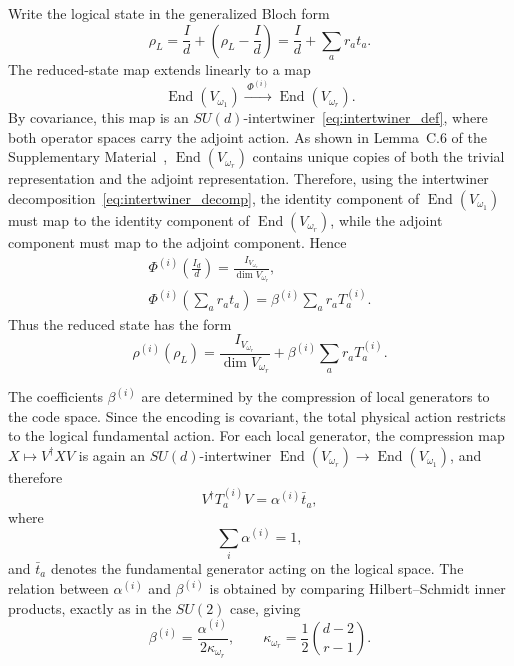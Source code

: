 \documentclass[10pt,twocolumn,superscriptaddress,aps,amsmath,amssymb,citeautoscript,floatfix,prx]{revtex4-2}
\theoremstyle{plain}
\theoremstyle{plain}
\theoremstyle{plain}
\theoremstyle{plain}
\theoremstyle{plain}
\theoremstyle{plain}
\begin{document}
Write the logical state in the generalized Bloch form
\begin{equation}\label{eq:general_bloch}
\rho_L
=
\frac{I}{d}
+
\left(\rho_L-\frac{I}{d}\right)
=
\frac{I}{d}
+
\sum_a r_a t_a .
\end{equation}
The reduced-state map extends linearly to a map
$$
    \operatorname{End}(V_{\omega_1})
    \xrightarrow{\;\Phi^{(i)}\;}
    \operatorname{End}(V_{\omega_r}) .
$$
By covariance, this map is an $SU(d)$-intertwiner~\eqref{eq:intertwiner_def}, where both operator spaces carry the adjoint action. As shown in Lemma~C.6 of the Supplementary Material~\cite{SuppMat}, $\operatorname{End}(V_{\omega_r})$ contains unique copies of both the trivial representation and the adjoint representation. Therefore, using the intertwiner decomposition~\eqref{eq:intertwiner_decomp}, the identity component of $\operatorname{End}(V_{\omega_1})$ must map to the identity component of $\operatorname{End}(V_{\omega_r})$, while the adjoint component must map to the adjoint component. Hence
\begin{equation}\label{eq:linear_ext_of_red_state}
\begin{gathered}
\Phi^{(i)}\left(\frac{I_d}{d}\right)
=
\frac{I_{V_{\omega_r}}}{\dim V_{\omega_r}},
\\
\Phi^{(i)}\left(\sum_a r_a t_a\right)
=
\beta^{(i)}
\sum_a r_a T_a^{(i)} .
\end{gathered}
\end{equation}
Thus the reduced state has the form
\begin{equation}\label{eq:reduced_state_sud}
\rho^{(i)}(\rho_L)
=
\frac{I_{V_{\omega_r}}}{\dim V_{\omega_r}}
+
\beta^{(i)}
\sum_a r_a T_a^{(i)}.
\end{equation}

The coefficients $\beta^{(i)}$ are determined by the compression of local generators to the code space. Since the encoding is covariant, the total physical action restricts to the logical fundamental action. For each local generator, the compression map $X\mapsto V^\dagger X V$ is again an $SU(d)$-intertwiner $\operatorname{End}(V_{\omega_r})\rightarrow \operatorname{End}(V_{\omega_1})$, and therefore
$$
V^\dagger T_a^{(i)}V
=
\alpha^{(i)}\bar t_a ,
$$
where
$$
\sum_i\alpha^{(i)}=1,
$$
and $\bar t_a$ denotes the fundamental generator acting on the logical space. The relation between $\alpha^{(i)}$ and $\beta^{(i)}$ is obtained by comparing Hilbert--Schmidt inner products, exactly as in the $SU(2)$ case, giving
$$
\beta^{(i)}
=
\frac{\alpha^{(i)}}{2\kappa_{\omega_r}},
\qquad
\kappa_{\omega_r}
=
\frac12\binom{d-2}{r-1}.
$$
\end{document}
